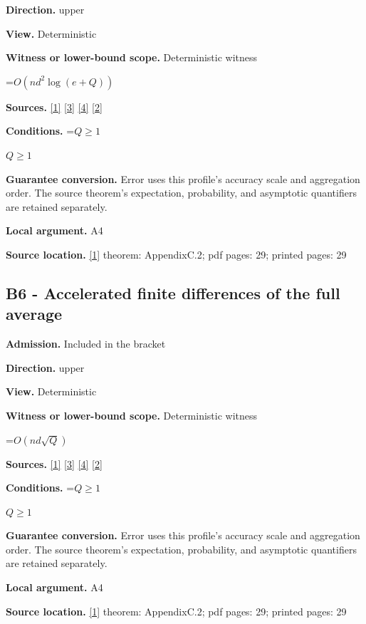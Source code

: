 \documentclass[10pt,a4paper]{article}
\newcommand{\AtlasMath}[1]{\par\begingroup\centering\setbox0=\hbox{$\displaystyle #1$}\ifdim\wd0>1.4\linewidth\typeout{ATLAS WIDE FORMULA: \the\wd0}\fi\ifdim\wd0>\linewidth\resizebox{\linewidth}{!}{\box0}\else\box0\fi\par\endgroup}
\newcommand{\AtlasInlineMath}[1]{\begingroup\setbox0=\hbox{$#1$}\ifdim\wd0>.4\linewidth\endgroup\AtlasMath{#1}\else\endgroup$#1$\fi}
\begin{document}
\textbf{Direction.} upper

\textbf{View.} Deterministic

\textbf{Witness or lower-bound scope.} Deterministic witness

\AtlasMath{O(nd^2\log(e+Q))}
\textbf{Sources.} \href{https://arxiv.org/html/2610.00345v1}{[1]} \href{https://arxiv.org/html/2607.16558v2}{[3]} \href{https://www.mathnet.ru/php/archive.phtml?jrnid=mzm&option_lang=eng&paperid=1697&wshow=paper}{[4]} \href{https://arxiv.org/abs/2109.08858}{[2]}

\textbf{Conditions.} \AtlasInlineMath{Q\ge1}

\textbf{Guarantee conversion.} Error uses this profile's accuracy scale and aggregation order. The source theorem's expectation, probability, and asymptotic quantifiers are retained separately.

\textbf{Local argument.} A4

\textbf{Source location.} \href{https://arxiv.org/html/2610.00345v1}{[1]} theorem: AppendixC.2; pdf pages: 29; printed pages: 29

\subsection{B6 - Accelerated finite differences of the full average}
\textbf{Admission.} Included in the bracket

\textbf{Direction.} upper

\textbf{View.} Deterministic

\textbf{Witness or lower-bound scope.} Deterministic witness

\AtlasMath{O(nd\sqrt Q)}
\textbf{Sources.} \href{https://arxiv.org/html/2610.00345v1}{[1]} \href{https://arxiv.org/html/2607.16558v2}{[3]} \href{https://www.mathnet.ru/php/archive.phtml?jrnid=mzm&option_lang=eng&paperid=1697&wshow=paper}{[4]} \href{https://arxiv.org/abs/2109.08858}{[2]}

\textbf{Conditions.} \AtlasInlineMath{Q\ge1}

\textbf{Guarantee conversion.} Error uses this profile's accuracy scale and aggregation order. The source theorem's expectation, probability, and asymptotic quantifiers are retained separately.

\textbf{Local argument.} A4

\textbf{Source location.} \href{https://arxiv.org/html/2610.00345v1}{[1]} theorem: AppendixC.2; pdf pages: 29; printed pages: 29
\end{document}
